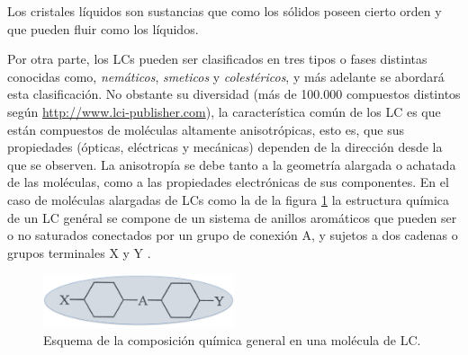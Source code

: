 Los cristales líquidos son sustancias que como los
sólidos poseen cierto orden y que pueden fluir como los líquidos. 

Por otra parte, los LCs pueden ser clasificados en tres tipos o fases distintas
conocidas como, \textit{nemáticos},
\textit{smeticos} y \textit{colestéricos}, y más adelante se abordará esta
clasificación. No obstante su diversidad (más de 100.000 compuestos
distintos según \url{http://www.lci-publisher.com}), la característica común de los LC es que están
compuestos de moléculas altamente anisotrópicas, esto es, que sus
propiedades (ópticas, eléctricas y mecánicas) dependen de la
dirección desde la que se observen. La anisotropía se debe tanto a la
geometría alargada o achatada de las moléculas, como a las propiedades
electrónicas de sus componentes.  En el caso de moléculas
alargadas de LCs como la de la figura \ref{fig:LCMolecule} la
estructura química de un LC genéral se
compone de un sistema de anillos aromáticos que pueden ser o no
saturados conectados por un grupo de conexión A, y sujetos a dos
cadenas o grupos terminales X y Y . 
\begin{figure}[h!]
\centering
    \includegraphics[width=0.5\textwidth]{LCMolecule}
\caption{Esquema de la composición química general en una molécula de LC.}
\label{fig:LCMolecule}
\end{figure}


